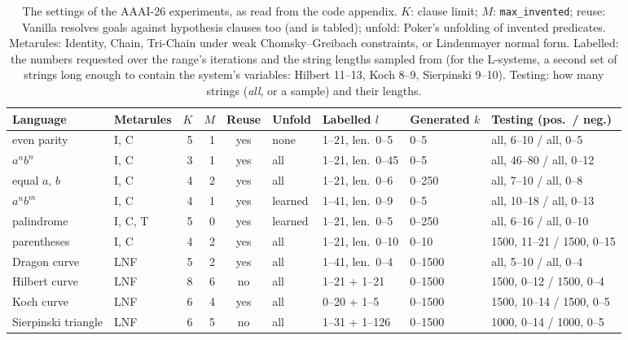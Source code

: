 \documentclass[11pt]{article}
\begin{document}
\begin{table}[ht]
\centering
\footnotesize
\setlength{\tabcolsep}{3pt}
\begin{tabular}{llrrcllll}
\toprule
Language & Metarules & $K$ & $M$ & Reuse & Unfold & Labelled $l$ & Generated $k$ & Testing (pos.\ / neg.)\\
\midrule
even parity      & I, C    & 5 & 1 & yes & none    & 1--21, len.\ 0--5   & 0--5       & all, 6--10 / all, 0--5\\
$a^nb^n$         & I, C    & 3 & 1 & yes & all     & 1--21, len.\ 0--45  & 0--5       & all, 46--80 / all, 0--12\\
equal $a$, $b$   & I, C    & 4 & 2 & yes & all     & 1--21, len.\ 0--6   & 0--250     & all, 7--10 / all, 0--8\\
$a^nb^m$         & I, C    & 4 & 1 & yes & learned & 1--41, len.\ 0--9   & 0--5       & all, 10--18 / all, 0--13\\
palindrome       & I, C, T & 5 & 0 & yes & learned & 1--21, len.\ 0--5   & 0--250     & all, 6--16 / all, 0--10\\
parentheses      & I, C    & 4 & 2 & yes & all     & 1--21, len.\ 0--10  & 0--10      & 1500, 11--21 / 1500, 0--15\\
\midrule
Dragon curve     & LNF     & 5 & 2 & yes & all     & 1--41, len.\ 0--4   & 0--1500    & all, 5--10 / all, 0--4\\
Hilbert curve    & LNF     & 8 & 6 & no  & all     & 1--21 + 1--21       & 0--1500    & 1500, 0--12 / 1500, 0--4\\
Koch curve       & LNF     & 6 & 4 & yes & all     & 0--20 + 1--5        & 0--1500    & 1500, 10--14 / 1500, 0--5\\
Sierpinski triangle & LNF  & 6 & 5 & no  & all     & 1--31 + 1--126      & 0--1500    & 1000, 0--14 / 1000, 0--5\\
\bottomrule
\end{tabular}
\caption{The settings of the AAAI-26 experiments, as read from the code appendix.
$K$: clause limit; $M$: \texttt{max\_invented}; reuse: Vanilla resolves goals
against hypothesis clauses too (and is tabled); unfold: Poker's unfolding of
invented predicates. Metarules: Identity, Chain, Tri-Chain under weak
Chomsky--Greibach constraints, or Lindenmayer normal form. Labelled: the numbers
requested over the range's iterations and the string lengths sampled from (for the
L-systems, a second set of strings long enough to contain the system's variables:
Hilbert 11--13, Koch 8--9, Sierpinski 9--10). Testing: how many strings
(\emph{all}, or a sample) and their lengths.}
\label{tab:aaai-settings}
\end{table}
\end{document}
